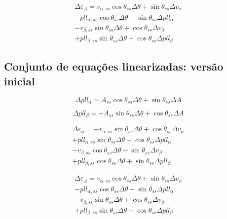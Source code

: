 \documentclass[12pt,a4paper]{report}
\begin{document}
\begin{multline}
\Delta\varepsilon_A =
v_{\alpha,ss} \cos \theta_{ss} \Delta \theta 
+ \sin \theta_{ss}  \Delta v_\alpha \\
- pll_{\alpha,ss} \cos \theta_{ss} \Delta \theta
- \sin \theta_{ss} \Delta pll_\alpha \\
- v_{\beta,ss} \sin \theta_{ss}  \Delta \theta
+ \cos \theta_{ss} \Delta v_\beta \\
+ pll_{\beta,ss} \sin \theta_{ss}  \Delta \theta
- \cos \theta_{ss} \Delta pll_\beta
\label{eq:erro:amp:Lin}
\end{multline}












\subsection{Conjunto de equações linearizadas: versão inicial}

\begin{equation}
\Delta pll_{\alpha} = 
A_{ss} \cos \theta_{ss} \Delta \theta +
\sin \theta_{ss} \Delta A
\end{equation}



\begin{equation}
\Delta pll_{\beta} = 
- A_{ss} \sin \theta_{ss} \Delta \theta +
\cos \theta_{ss} \Delta A
\end{equation}


\begin{multline}
\Delta \varepsilon_\phi = 
-v_{\alpha,ss} \sin \theta_{ss}  \Delta \theta
+\cos \theta_{ss} \Delta v_{\alpha} \\
+pll_{\alpha,ss} \sin \theta_{ss}  \Delta \theta
- \cos \theta_{ss}  \Delta pll_\alpha \\
- v_{\beta,ss} \cos \theta_{ss}  \Delta \theta
- \sin \theta_{ss} \Delta v_\beta \\
+ pll_{\beta,ss} \cos \theta_{ss}  \Delta \theta
+ \sin \theta_{ss}  \Delta pll_\beta
\end{multline}



\begin{multline}
\Delta\varepsilon_A =
v_{\alpha,ss} \cos \theta_{ss} \Delta \theta 
+ \sin \theta_{ss}  \Delta v_\alpha \\
- pll_{\alpha,ss} \cos \theta_{ss} \Delta \theta
- \sin \theta_{ss} \Delta pll_\alpha \\
- v_{\beta,ss} \sin \theta_{ss}  \Delta \theta
+ \cos \theta_{ss} \Delta v_\beta \\
+ pll_{\beta,ss} \sin \theta_{ss}  \Delta \theta
- \cos \theta_{ss} \Delta pll_\beta
\end{multline}
\end{document}
